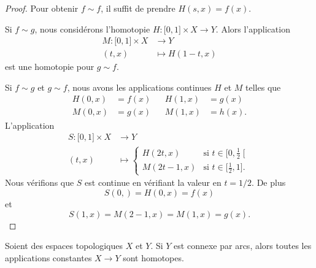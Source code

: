 \begin{proof}
    Pour obtenir \( f\sim f\), il suffit de prendre \( H(s,x)=f(x)\).

    Si \( f\sim g\), nous considérons l'homotopie \( H\colon \mathopen[ 0 , 1 \mathclose]\times X\to Y\). Alors l'application
    \begin{equation}
        \begin{aligned}
            M\colon \mathopen[ 0 , 1 \mathclose]\times X&\to Y \\
            (t,x)&\mapsto H(1-t,x) 
        \end{aligned}
    \end{equation}
    est une homotopie pour \( g\sim f\).

    Si \( f\sim g\) et \( g\sim f\), nous avons les applications continues \( H\) et \( M\) telles que
    \begin{subequations}
        \begin{align}
        H(0,x)&=f(x)&&H(1,x)&=g(x)\\
        M(0,x)&=g(x)&&M(1,x)&=h(x).
        \end{align}
    \end{subequations}
    L'application
    \begin{equation}
        \begin{aligned}
            S\colon \mathopen[ 0 , 1 \mathclose]\times X&\to Y \\
            (t,x)&\mapsto \begin{cases}
                H(2t,x)    &   \text{si } t\in\mathopen[ 0 , \frac{ 1 }{2} \mathclose[\\
                M(2t-1,x)    &    \text{si }t\in\mathopen[ \frac{ 1 }{2} , 1 \mathclose].
            \end{cases}
        \end{aligned}
    \end{equation}
    Nous vérifions que \( S\) est continue en vérifiant la valeur en \( t=1/2\). De plus 
    \begin{equation}
        S(0,)=H(0,x)=f(x)
    \end{equation}
    et
    \begin{equation}
        S(1,x)=M(2-1,x)=M(1,x)=g(x).
    \end{equation}
\end{proof}


\begin{lemma}   \label{LEMooMJKEooCaVhjD}
    Soient des espaces topologiques \( X\) et \( Y\). Si \( Y\) est connexe par arcs, alors toutes les applications constantes \( X\to Y\) sont homotopes.
\end{lemma}

